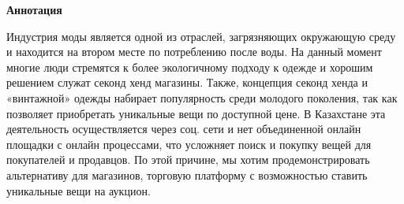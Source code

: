 \newpage
\pagestyle{plain}

{
\begin{center}
    \Large
    \textbf{Аннотация}
\end{center}
Индустрия моды является одной из отраслей, загрязняющих окружающую среду и находится на втором месте по потреблению после воды. На данный момент многие люди стремятся к более экологичному подходу к одежде и хорошим решением служат секонд хенд магазины. Также, концепция секонд хенда и «винтажной» одежды набирает популярность среди молодого поколения, так как позволяет приобретать уникальные вещи по доступной цене. В Казахстане эта деятельность осуществляется через соц. сети и нет объединенной онлайн площадки с онлайн процессами, что усложняет поиск и покупку вещей для покупателей и продавцов. По этой причине, мы хотим продемонстрировать альтернативу для магазинов, торговую платформу с возможностью ставить уникальные вещи на аукцион.  

}
